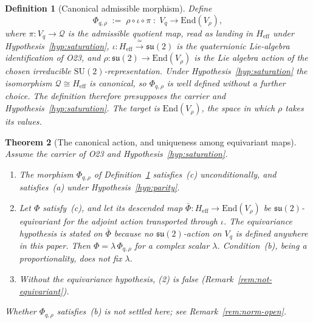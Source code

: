 \documentclass[11pt,a4paper]{article}
\newtheorem{theorem}{Theorem}[section]
\newtheorem{definition}[theorem]{Definition}
\theoremstyle{remark}
\begin{document}
  \begin{definition}[Canonical admissible morphism]
    \label{def:Phi}
    Define
    \[
      \Phi_{q,\rho} \;:=\; \rho \circ \iota \circ \pi
      \;\colon\; V_q \longrightarrow \mathrm{End}(V_\rho),
    \]
    where $\pi \colon V_q \to \mathcal{Q}$ is the admissible quotient map, read as landing in
    $H_{\mathrm{eff}}$ under Hypothesis~\ref{hyp:saturation}, $\iota \colon
    H_{\mathrm{eff}} \xrightarrow{\,\simeq\,} \mathfrak{su}(2)$ is the quaternionic Lie-algebra
    identification of O23, and $\rho \colon \mathfrak{su}(2) \to \mathrm{End}(V_\rho)$ is the Lie
    algebra action of the chosen irreducible $\mathrm{SU}(2)$-representation.
    Under Hypothesis~\ref{hyp:saturation} the isomorphism
    $\mathcal{Q} \cong H_{\mathrm{eff}}$ is canonical, so $\Phi_{q,\rho}$ is well defined
    without a further choice.
    The definition therefore presupposes the carrier and Hypothesis~\ref{hyp:saturation}.
    The target is $\mathrm{End}(V_\rho)$, the space in which $\rho$ takes its values.
  \end{definition}

  \begin{theorem}[The canonical action, and uniqueness among equivariant maps]
    \label{thm:main}
    Assume the carrier of O23 and Hypothesis~\ref{hyp:saturation}.
    \begin{enumerate}
      \item[(1)] The morphism $\Phi_{q,\rho}$ of Definition~\ref{def:Phi} satisfies~(c)
      unconditionally, and satisfies~(a) under Hypothesis~\ref{hyp:parity}.
      \item[(2)] Let $\Phi$ satisfy~(c), and let its descended map
      $\bar\Phi \colon H_{\mathrm{eff}} \to \mathrm{End}(V_\rho)$ be
      $\mathfrak{su}(2)$-equivariant for the adjoint action transported through $\iota$.
      The equivariance hypothesis is stated on $\bar\Phi$ because no
      $\mathfrak{su}(2)$-action on $V_q$ is defined anywhere in this paper.
      Then $\Phi = \lambda\,\Phi_{q,\rho}$ for a complex scalar $\lambda$.
      Condition~(b), being a proportionality, does not fix $\lambda$.
      \item[(3)] Without the equivariance hypothesis, (2) is false
      (Remark~\ref{rem:not-equivariant}).
    \end{enumerate}
    Whether $\Phi_{q,\rho}$ satisfies~(b) is not settled here; see Remark~\ref{rem:norm-open}.
  \end{theorem}
\end{document}
